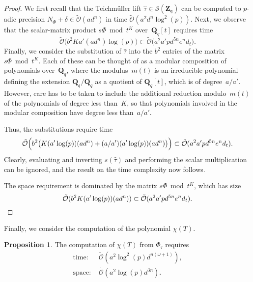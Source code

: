 \documentclass[a4paper,11pt]{article}
\numberwithin{equation}{section}
\newcommand{\ZZ}{\mathbf{Z}} %
\newcommand{\QQ}{\mathbf{Q}} %
\providecommand{\SoftOh}{\tilde{\mathcal{O}}} %
\theoremstyle{definition}
\newtheorem{prop}[thm]{Proposition}
\begin{document}
\begin{proof}
We first recall that the Teichm\"uller lift 
$\hat{\tau} \in \mathcal{S}(\ZZ_{\mathfrak{q}})$ 
can be computed to $p$-adic precision $N_{\Phi}+\delta \in \SoftOh(a d^n)$ 
in time $\SoftOh(a^2 d^n \log^2(p))$.  Next, we observe that the 
scalar-matrix product $s \Phi \bmod t^K$ over~$\QQ_q[t]$ 
requires time 
\begin{equation*}
\SoftOh\bigl( b^2 K a' (a d^n) \log(p) \bigr) 
    \subset \SoftOh\bigl( a^2 a' p d^{5n} e^n d_t \bigr).
\end{equation*}
Finally, we consider the substitution of $\hat{\tau}$ 
into the $b^2$ entries of the matrix $s \Phi \bmod t^K$. 
Each of these can be thought of as a modular composition of polynomials 
over~$\QQ_{q}$, where the modulus~$m(t)$ is an irreducible polynomial defining 
the extension $\QQ_{\mathfrak{q}} / \QQ_{q}$ as a quotient of $\QQ_q[t]$, 
which is of degree~$a/a'$. However, care has to be taken to include the 
additional reduction modulo~$m(t)$ of the polynomials of degree less than~$K$, 
so that polynomials involved in the modular composition have degree less 
than~$a/a'$. 

Thus, the substitutions require time %
\begin{equation*}
\SoftOh\Bigl( b^2 \bigl(K (a' \log(p)) (a d^n) + (a/a') (a' \log(p)) (a d^n) \bigr) \Bigr)
    \subset \SoftOh(a^2 a' p d^{5n} e^n d_t).
\end{equation*}
Clearly, evaluating and inverting $s(\hat{\tau})$ and performing the 
scalar multiplication can be ignored, and the result on the time complexity now follows.

The space requirement is dominated by the matrix $s \Phi \bmod t^K$, 
which has size 
\begin{equation*}
\SoftOh(b^2 K (a' \log(p)) (a d^n)) \subset \SoftOh(a^2 a' p d^{5n} e^n d_t). 
\qedhere
\end{equation*}
\end{proof}

Finally, we consider the computation of the polynomial $\chi(T)$.

\begin{prop}
The computation of $\chi(T)$ from $\Phi_{\tau}$ requires
\begin{align*}
\mbox{time: }  & \SoftOh(a^2  \log^2(p) d^{n(\omega+1)}), \\
\mbox{space: } & \SoftOh(a^2 \log(p) d^{3n}).
\end{align*}
\end{prop}
\end{document}
